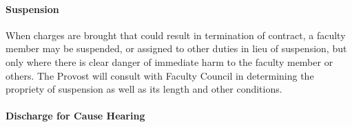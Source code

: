 			\paragraph{Suspension}
				\label{sec:Suspension}
				When charges are brought that could result in termination of contract, a faculty member may be suspended, or assigned to other duties in lieu of suspension, but only where there is clear danger of immediate harm to the faculty member or others.  The Provost will consult with Faculty Council in determining the propriety of suspension as well as its length and other conditions.
			\paragraph{Discharge for Cause Hearing}
				\label{sec:DischargeForCauseHearing}


